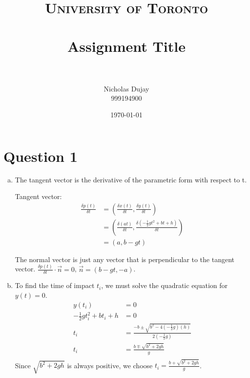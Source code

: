 \documentclass{article} %
\title{
\normalfont \normalsize
\textsc{University of Toronto} \\ [25pt] %
\horrule{0.5pt} \\[0.4cm] %
\huge Assignment Title \\ %
\horrule{2pt} \\[0.5cm] %
}
\author{Nicholas Dujay\\999194900} %
\date{\normalsize\today} %
\begin{document}
\maketitle %


\section{Question 1}

\begin{enumerate}[a)]

\item

The tangent vector is the derivative of the parametric form with respect to t.

Tangent vector:
\begin{align*}
\frac{\delta p(t)}{\delta t} &= \left(\frac{\delta x(t)}{\delta t}, \frac{\delta y(t)}{\delta t}\right)\\
&= \left(\frac{\delta (at)}{\delta t}, \frac{\delta (-\frac{1}{2}gt^2 + bt + h)}{\delta t}\right)\\
&= (a, b - gt)
\end{align*}

The normal vector is just any vector that is perpendicular to the tangent vector. $\frac{\delta p(t)}{\delta t} \cdot \vec{n} = 0$, $\vec{n} = (b - gt, -a)$.


\item

To find the time of impact $t_i$, we must solve the quadratic equation for $y(t) = 0$.
\begin{align*}
y(t_i) &= 0\\
-\frac{1}{2}gt_i^2 + bt_i + h &= 0\\
t_i &= \frac{-b \pm \sqrt{b^2 - 4(-\frac{1}{2}g)(h)} }{2(-\frac{1}{2}g)}\\
t_i &= \frac{b \mp \sqrt{b^2 + 2gh} }{g}\\
\end{align*}
Since $\sqrt{b^2 + 2gh}$ is always positive, we choose $t_i = \frac{b + \sqrt{b^2 + 2gh} }{g}$.


\end{enumerate}
\end{document}
